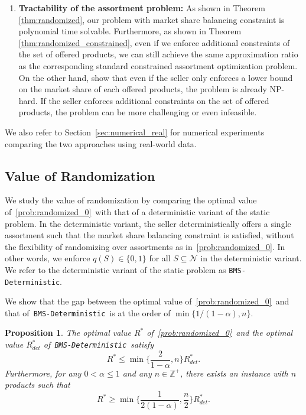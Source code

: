 \documentclass[mnsc,non-blindrev]{informs3}
\newtheorem{proposition}[theorem]{Proposition}
\theoremstyle{definition}
\begin{document}
{\begin{enumerate}
\item {\bf Tractability of the assortment problem:} As shown in Theorem \ref{thm:randomized}, our problem with market share balancing constraint is polynomial time solvable. Furthermore, as shown in Theorem \ref{thm:randomized_constrained}, even if we enforce additional constraints of the set of offered products, we can still achieve the same approximation ratio as the corresponding standard constrained assortment optimization problem. On the other hand, \cite{zhu2024unified} show that even if the seller only enforces a lower bound on the market share of each offered products, the problem is already NP-hard. If the seller enforces additional constraints on the set of offered products, the problem can be more challenging or even infeasible.

\end{enumerate}

We also refer to Section~\ref{sec:numerical_real} for numerical experiments comparing the two approaches using real-world data.

}

\subsection{Value of Randomization}\label{sec:value_randomization}

We study the value of randomization by comparing the optimal value of~\ref{prob:randomized_0}~with that of a deterministic variant of the static problem. In the deterministic variant, the seller deterministically offers a single assortment such that the market share balancing constraint is satisfied, without the flexibility of randomizing over assortments as in~\ref{prob:randomized_0}. In other words, we enforce $q(S)\in\{0,1\}$ for all $S\subseteq\mathcal{N}$ in the deterministic variant. We refer to the deterministic variant of the static problem as \texttt{BMS-Deterministic}.

We show that the gap between the optimal value of~\ref{prob:randomized_0}~and that of~\texttt{BMS-Deterministic}~is at the order of $\min\{1/(1-\alpha),n\}$.

\vspace{0.5em}

\begin{proposition}\label{thm:value_randomization}
The optimal value $R^*$ of~\ref{prob:randomized_0}~and the optimal value $R^*_{det}$ of~\texttt{BMS-Deterministic}~satisfy
\begin{equation}
R^*\leq \min\Big\{\dfrac{2}{1-\alpha},n\Big\}R^*_{det}.\label{eq:gap_upper_bound}
\end{equation}
Furthermore, for any $0<\alpha\leq 1$ and any $n\in\mathbb{Z}^+$, there exists an instance with $n$ products such that
\begin{equation}
R^*\geq \min\Big\{\dfrac{1}{2(1-\alpha)},\dfrac{n}{2}\Big\}R^*_{det}.\label{eq:gap_lower_bound}
\end{equation}
\end{proposition}
\end{document}
